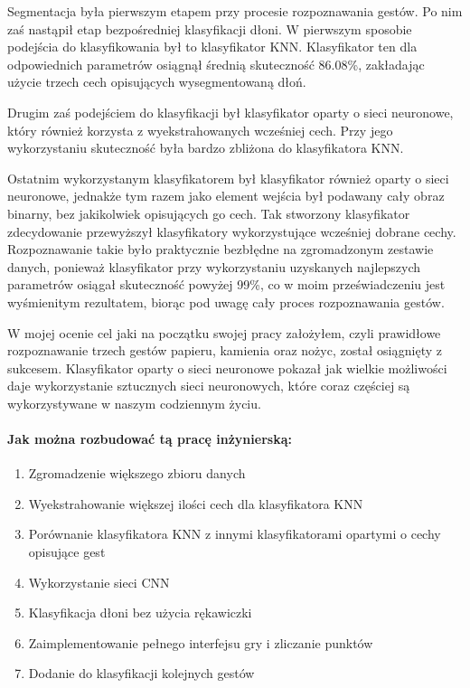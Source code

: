 \documentclass[a4paper,12pt,twoside,openany]{report}
\begin{document}
	Segmentacja była pierwszym etapem przy procesie rozpoznawania gestów. Po nim zaś nastąpił etap bezpośredniej klasyfikacji dłoni. W pierwszym sposobie podejścia do klasyfikowania był to klasyfikator KNN. Klasyfikator ten dla odpowiednich parametrów osiągnął średnią skuteczność 86.08\%, zakładając użycie trzech cech opisujących wysegmentowaną dłoń. 
	
	Drugim zaś podejściem do klasyfikacji był klasyfikator oparty o sieci neuronowe, który również korzysta z wyekstrahowanych wcześniej cech. Przy jego wykorzystaniu skuteczność była bardzo zbliżona do klasyfikatora KNN.
	
	 Ostatnim wykorzystanym klasyfikatorem był klasyfikator również oparty o sieci neuronowe, jednakże tym razem jako element wejścia był podawany cały obraz binarny, bez jakikolwiek opisujących go cech. Tak stworzony klasyfikator zdecydowanie przewyższył klasyfikatory wykorzystujące wcześniej dobrane cechy. Rozpoznawanie takie było praktycznie bezbłędne na zgromadzonym zestawie danych, ponieważ klasyfikator przy wykorzystaniu uzyskanych najlepszych parametrów osiągał skuteczność powyżej 99\%, co w moim przeświadczeniu jest wyśmienitym rezultatem, biorąc pod uwagę cały proces rozpoznawania gestów.
	
	W mojej ocenie cel jaki na początku swojej  pracy założyłem, czyli prawidłowe rozpoznawanie trzech gestów papieru, kamienia oraz nożyc, został osiągnięty z sukcesem. Klasyfikator oparty o sieci neuronowe pokazał jak  wielkie możliwości daje wykorzystanie sztucznych sieci neuronowych, które coraz częściej są wykorzystywane w naszym codziennym życiu.
	
	\paragraph{Jak można rozbudować tą pracę inżynierską: }
	\begin{enumerate}
		\item Zgromadzenie większego zbioru danych 
		\item Wyekstrahowanie większej ilości cech dla klasyfikatora KNN 
		\item Porównanie klasyfikatora KNN z innymi klasyfikatorami opartymi o cechy opisujące gest
		\item Wykorzystanie sieci CNN
		\item Klasyfikacja dłoni bez użycia rękawiczki
		\item Zaimplementowanie pełnego interfejsu gry i zliczanie punktów
		\item Dodanie do klasyfikacji kolejnych gestów
	\end{enumerate}
	
\end{document}

